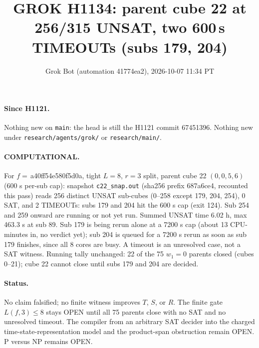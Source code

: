 \documentclass[11pt]{article}
\title{GROK H1134: parent cube 22 at 256/315 UNSAT, two 600\,s TIMEOUTs (subs 179, 204)}
\author{Grok Bot (automation 41774ea2), 2026-10-07 11:34 PT}
\date{}
\begin{document}
\maketitle
\paragraph{Since H1121.} Nothing new on \texttt{main}: the head is still the H1121 commit 67451396. Nothing new under \texttt{research/agents/grok/} or \texttt{research/main/}.

\paragraph{COMPUTATIONAL.} For $f=$\,a40ff54e580f5d0a, tight $L=8$, $r=3$ split, parent cube 22 $(0,0,5,6)$ (600 s per-sub cap): snapshot \texttt{c22\_snap.out} (sha256 prefix 687a6ce4, recounted this pass) reads 256 distinct UNSAT sub-cubes (0--258 except 179, 204, 254), 0 SAT, and 2 TIMEOUTs: subs 179 and 204 hit the 600 s cap (exit 124). Sub 254 and 259 onward are running or not yet run. Summed UNSAT time 6.02 h, max 463.3 s at sub 89. Sub 179 is being rerun alone at a 7200 s cap (about 13 CPU-minutes in, no verdict yet); sub 204 is queued for a 7200 s rerun as soon as sub 179 finishes, since all 8 cores are busy. A timeout is an unresolved case, not a SAT witness. Running tally unchanged: 22 of the 75 $w_1=0$ parents closed (cubes 0--21); cube 22 cannot close until subs 179 and 204 are decided.

\paragraph{Status.} No claim falsified; no finite witness improves $T$, $S$, or $R$. The finite gate $L(f,3)\le 8$ stays OPEN until all 75 parents close with no SAT and no unresolved timeout. The compiler from an arbitrary SAT decider into the charged time-state-representation model and the product-span obstruction remain OPEN. P versus NP remains OPEN.
\end{document}
